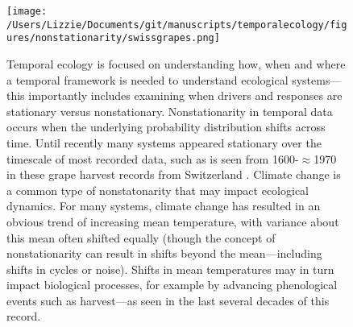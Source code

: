 \documentclass[11pt,a4paper,oneside]{article}
\begin{document}


\newpage
\begin{footnotesize}
{\def\section*#1{}

}
\end{footnotesize}

\newpage


\begin{figure}[h!]
\centering
\noindent \texttt{[image: /Users/Lizzie/Documents/git/manuscripts/temporalecology/figures/nonstationarity/swissgrapes.png]}
\caption{Temporal ecology is focused on understanding how, when and where a temporal framework is needed to understand ecological systems---this importantly includes examining when drivers and responses are stationary versus nonstationary. Nonstationarity in temporal data occurs when the underlying probability distribution shifts across time. Until recently many systems appeared stationary over the timescale of most recorded data, such as is seen from 1600-$\approx$1970 in these grape harvest records from Switzerland \citep{Meier:2007zh}. Climate change is a common type of nonstatonarity that may impact ecological dynamics. For many systems, climate change has resulted in an obvious trend of increasing mean temperature, with variance about this mean often shifted equally \citep{Huntingford2013,Rhines2013} (though the concept of nonstationarity can result in shifts beyond the mean---including shifts in cycles or noise). Shifts in mean temperatures may in turn impact biological processes, for example by advancing phenological events such as harvest---as seen in the last several decades of this record.}
\end{figure}
\end{document}
